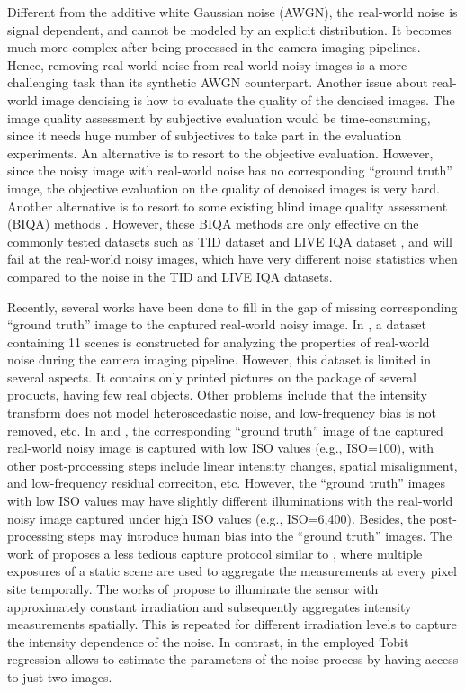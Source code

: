 Different from the additive white Gaussian noise (AWGN), the real-world noise is signal dependent, and cannot be modeled by an explicit distribution. It becomes much more complex after being processed in the camera imaging pipelines. Hence, removing real-world noise from real-world noisy images is a more challenging task than its synthetic AWGN counterpart. Another issue about real-world image denoising is how to evaluate the quality of the denoised images. The image quality assessment by subjective evaluation would be time-consuming, since it needs huge number of subjectives to take part in the evaluation experiments. An alternative is to resort to the objective evaluation. However, since the noisy image with real-world noise has no corresponding ``ground truth'' image, the objective evaluation on the quality of denoised images is very hard. Another alternative is to resort to some existing blind image quality assessment (BIQA) methods \cite{bliinds,biqi}. However, these BIQA methods are only effective on the commonly tested datasets such as TID dataset \cite{tid2008} and LIVE IQA dataset \cite{LIVEIQA}, and will fail at the real-world noisy images, which have very different noise statistics when compared to the noise in the TID \cite{tid2008} and LIVE IQA \cite{LIVEIQA} datasets.

Recently, several works have been done to fill in the gap of missing corresponding ``ground truth'' image to the captured real-world noisy image. In \cite{crosschannel2016}, a dataset containing 11 scenes is constructed for analyzing the properties of real-world noise during the camera imaging pipeline. However, this dataset is limited in several aspects. It contains only printed pictures on the package of several products, having few real objects. Other problems include that the intensity transform does not model heteroscedastic noise, and low-frequency bias is not removed, etc. In \cite{RENOIR2014} and \cite{dnd2017}, the corresponding ``ground truth'' image of the captured real-world noisy image is captured with low ISO values (e.g., ISO=100), with other post-processing steps include linear intensity changes, spatial misalignment, and low-frequency residual correciton, etc. However, the ``ground truth'' images with low ISO values may have slightly different illuminations with the real-world noisy image captured under high ISO values (e.g., ISO=6,400). Besides, the post-processing steps may introduce human bias into the ``ground truth'' images. The work of \cite{EMVA1288} proposes a less tedious capture protocol similar to \cite{dnd2017}, where multiple exposures of a static scene are used to aggregate the measurements at every pixel site temporally. The works of \cite{noisemeasurement,moldovan2006denoising} propose to illuminate the sensor with approximately constant irradiation and subsequently aggregates intensity measurements spatially. This is repeated for different irradiation levels to capture the intensity dependence of the noise. In contrast, in \cite{dnd2017} the employed Tobit regression allows to estimate the parameters of the noise process by having access to just two images.


